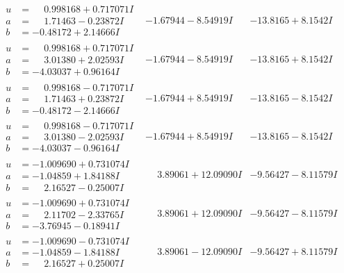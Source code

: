 \documentclass[1p]{elsarticle_modified}
\theoremstyle{definition}
\begin{document}
$$\begin{array}{c|c|c}
\begin{aligned}
u &= \phantom{-}0.998168 + 0.717071 I \\
a &= \phantom{-}1.71463 - 0.23872 I \\
b &= -0.48172 + 2.14666 I\end{aligned}
 & -1.67944 - 8.54919 I & -13.8165 + 8.1542 I \\ \hline\begin{aligned}
u &= \phantom{-}0.998168 + 0.717071 I \\
a &= \phantom{-}3.01380 + 2.02593 I \\
b &= -4.03037 + 0.96164 I\end{aligned}
 & -1.67944 - 8.54919 I & -13.8165 + 8.1542 I \\ \hline\begin{aligned}
u &= \phantom{-}0.998168 - 0.717071 I \\
a &= \phantom{-}1.71463 + 0.23872 I \\
b &= -0.48172 - 2.14666 I\end{aligned}
 & -1.67944 + 8.54919 I & -13.8165 - 8.1542 I \\ \hline\begin{aligned}
u &= \phantom{-}0.998168 - 0.717071 I \\
a &= \phantom{-}3.01380 - 2.02593 I \\
b &= -4.03037 - 0.96164 I\end{aligned}
 & -1.67944 + 8.54919 I & -13.8165 - 8.1542 I \\ \hline\begin{aligned}
u &= -1.009690 + 0.731074 I \\
a &= -1.04859 + 1.84188 I \\
b &= \phantom{-}2.16527 - 0.25007 I\end{aligned}
 & \phantom{-}3.89061 + 12.09090 I & -9.56427 - 8.11579 I \\ \hline\begin{aligned}
u &= -1.009690 + 0.731074 I \\
a &= \phantom{-}2.11702 - 2.33765 I \\
b &= -3.76945 - 0.18941 I\end{aligned}
 & \phantom{-}3.89061 + 12.09090 I & -9.56427 - 8.11579 I \\ \hline\begin{aligned}
u &= -1.009690 - 0.731074 I \\
a &= -1.04859 - 1.84188 I \\
b &= \phantom{-}2.16527 + 0.25007 I\end{aligned}
 & \phantom{-}3.89061 - 12.09090 I & -9.56427 + 8.11579 I \\ \hline\begin{aligned}

\end{aligned}
\end{array}$$
\end{document}
